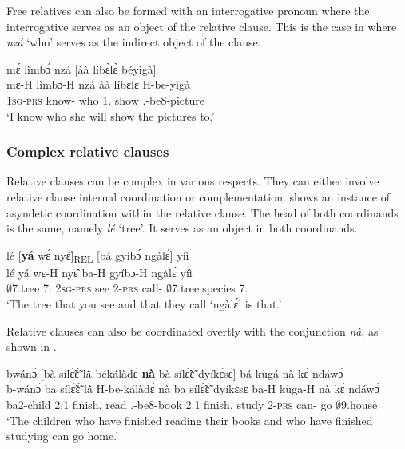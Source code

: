 Free relatives can also be formed with an interrogative pronoun where the interrogative serves as an object of the relative clause. This is the case in  where {\itshape nzá} `who' serves as the indirect object of the clause.


\ea\label{FREL3} 
  \glll mɛ́ lìmbɔ́ nzá [àà líbɛ̀lɛ̀ béyìgà]\textsubscript{{\REL}} \\
          mɛ-H lìmbɔ-H nzá {\db}àà líbɛlɛ H-be-yìgà \\
         1\textsc{sg}-\textsc{prs} know-{\R} who {\db}1.{\FUT} show {\OBJ}.{\LINK}-be8-picture  \\
    \trans `I know who she will show the pictures to.'
\z







\subsubsection{Complex relative clauses}
\label{sec:ComplREL}

Relative clauses can be complex in various respects. They can either involve relative clause internal coordination or complementation.  shows an instance of asyndetic coordination within the relative clause. The head of both coordinands is the same, namely {\itshape lé} `tree'. It serves as an object in both coordinands.


\ea\label{CREL1} 
  \glll lé [{\bfseries yá} wɛ́ nyɛ̂]\textsubscript{REL} [bá gyíbɔ́ ngàlɛ́]\textsubscript{{\REL}} yíì \\
        lé {\db}yá wɛ-H nyɛ̂ {\db}ba-H gyíbɔ-H ngàlɛ́ yíì \\
       $\emptyset$7.tree {\db}7:{\ATT} 2\textsc{sg}-\textsc{prs} see {\db}2-\textsc{prs} call-{\R} $\emptyset$7.tree.species 7.{\COP}   \\
    \trans `The tree that you see and that they call `ngàlɛ́' is that.'
\z

\noindent Relative clauses can also be coordinated overtly with the conjunction {\itshape nà}, as shown in .


\ea\label{CREL2} 
  \glll bwánɔ̀ [bà sílɛ̃́ɛ̃̀ lã̂ békálàdɛ̀ {\bfseries nà} bà sílɛ̃́ɛ̃̀ dyíkɛ̀sɛ̀]\textsubscript{{\REL}} bá kùgá nà kɛ̀ ndáwɔ̀\\
        b-wánɔ̀ {\db}ba sílɛ̃́ɛ̃̀ lã̂ H-be-kálàdɛ̀ nà ba sílɛ̃́ɛ̃̀ dyíkɛsɛ ba-H kùga-H nà kɛ̀ ndáwɔ̀\\
       ba2-child {\db}2.{\PST}1 finish.{\COMPL} read {\OBJ}.{\LINK}-be8-book {\CONJ} 2.{\PST}1 finish.{\COMPL} study 2-\textsc{prs} can-{\R} {\COM} go $\emptyset$9.house\\
    \trans `The children who have finished reading their books and who have finished studying can go home.'
\z

